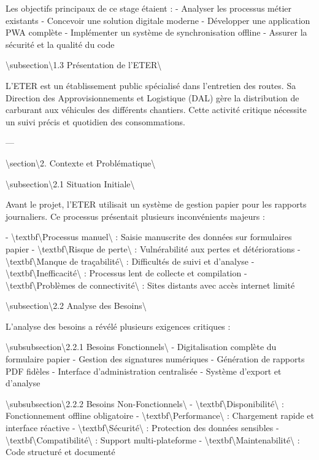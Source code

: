 \documentclass[12pt,a4paper]{report}
\begin{document}
Les objectifs principaux de ce stage étaient :
- Analyser les processus métier existants
- Concevoir une solution digitale moderne
- Développer une application PWA complète
- Implémenter un système de synchronisation offline
- Assurer la sécurité et la qualité du code

\textbackslash{}subsection\textbackslash{}{1.3 Présentation de l'ETER\textbackslash{}}

L'ETER est un établissement public spécialisé dans l'entretien des routes. Sa Direction des Approvisionnements et Logistique (DAL) gère la distribution de carburant aux véhicules des différents chantiers. Cette activité critique nécessite un suivi précis et quotidien des consommations.

---

\textbackslash{}section\textbackslash{}{2. Contexte et Problématique\textbackslash{}}

\textbackslash{}subsection\textbackslash{}{2.1 Situation Initiale\textbackslash{}}

Avant le projet, l'ETER utilisait un système de gestion papier pour les rapports journaliers. Ce processus présentait plusieurs inconvénients majeurs :

- \textbackslash{}textbf\textbackslash{}{Processus manuel\textbackslash{}} : Saisie manuscrite des données sur formulaires papier
- \textbackslash{}textbf\textbackslash{}{Risque de perte\textbackslash{}} : Vulnérabilité aux pertes et détériorations
- \textbackslash{}textbf\textbackslash{}{Manque de traçabilité\textbackslash{}} : Difficultés de suivi et d'analyse
- \textbackslash{}textbf\textbackslash{}{Inefficacité\textbackslash{}} : Processus lent de collecte et compilation
- \textbackslash{}textbf\textbackslash{}{Problèmes de connectivité\textbackslash{}} : Sites distants avec accès internet limité

\textbackslash{}subsection\textbackslash{}{2.2 Analyse des Besoins\textbackslash{}}

L'analyse des besoins a révélé plusieurs exigences critiques :

\textbackslash{}subsubsection\textbackslash{}{2.2.1 Besoins Fonctionnels\textbackslash{}}
- Digitalisation complète du formulaire papier
- Gestion des signatures numériques
- Génération de rapports PDF fidèles
- Interface d'administration centralisée
- Système d'export et d'analyse

\textbackslash{}subsubsection\textbackslash{}{2.2.2 Besoins Non-Fonctionnels\textbackslash{}}
- \textbackslash{}textbf\textbackslash{}{Disponibilité\textbackslash{}} : Fonctionnement offline obligatoire
- \textbackslash{}textbf\textbackslash{}{Performance\textbackslash{}} : Chargement rapide et interface réactive
- \textbackslash{}textbf\textbackslash{}{Sécurité\textbackslash{}} : Protection des données sensibles
- \textbackslash{}textbf\textbackslash{}{Compatibilité\textbackslash{}} : Support multi-plateforme
- \textbackslash{}textbf\textbackslash{}{Maintenabilité\textbackslash{}} : Code structuré et documenté
\end{document}
